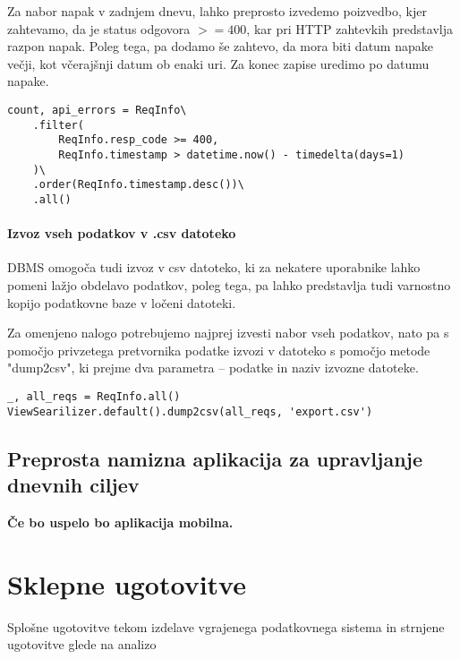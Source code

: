 \documentclass[a4paper,12pt,openright]{book}
\begin{document}
    Za nabor napak v zadnjem dnevu, lahko preprosto izvedemo poizvedbo, kjer zahtevamo, da je status odgovora $>= 400$, kar pri HTTP zahtevkih predstavlja razpon napak. Poleg tega, pa dodamo še zahtevo, da mora biti datum napake večji, kot včerajšnji datum ob enaki uri. Za konec zapise uredimo po datumu napake.
    
\begin{verbatim}
count, api_errors = ReqInfo\
    .filter(
        ReqInfo.resp_code >= 400,
        ReqInfo.timestamp > datetime.now() - timedelta(days=1)
    )\
    .order(ReqInfo.timestamp.desc())\
    .all()
\end{verbatim}

    \subsubsection{Izvoz vseh podatkov v .csv datoteko}

    DBMS omogoča tudi izvoz v csv datoteko, ki za nekatere uporabnike lahko pomeni lažjo obdelavo podatkov, poleg tega, pa lahko predstavlja tudi varnostno kopijo podatkovne baze v ločeni datoteki.

    Za omenjeno nalogo potrebujemo najprej izvesti nabor vseh podatkov, nato pa s pomočjo privzetega pretvornika podatke izvozi v datoteko s pomočjo metode "dump2csv", ki prejme dva parametra – podatke in naziv izvozne datoteke.
    
\begin{verbatim}
_, all_reqs = ReqInfo.all()
ViewSearilizer.default().dump2csv(all_reqs, 'export.csv')
\end{verbatim}

    \section{Preprosta namizna aplikacija za upravljanje dnevnih ciljev}

    \textbf{Če bo uspelo bo aplikacija mobilna.}
    

\chapter{Sklepne ugotovitve}
    \colorbox{BurntOrange}{Splošne ugotovitve tekom izdelave vgrajenega podatkovnega sistema}
    \newline
    \colorbox{BurntOrange}{in strnjene ugotovitve glede na analizo}


\raggedright

\printbibliography[heading=bibintoc,title={Literatura}]
\end{document}
